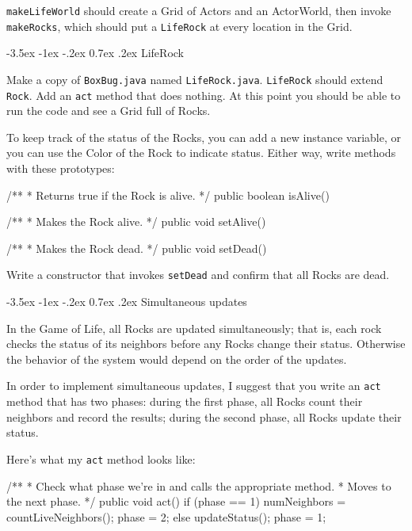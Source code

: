 \documentclass[12pt]{book}
\makeatletter
\renewcommand{\section}{\@startsection {section}{1}{\z@}%
    {-3.5ex \@plus -1ex \@minus -.2ex}%
    {0.7ex \@plus.2ex}%
    {\normalfont\Large\bfseries}}
\theoremstyle{exercise}
\newcommand{\java}[1]{\lstinline{#1}} %
\makeatother
\begin{document}
\java{makeLifeWorld} should create a Grid of Actors and an ActorWorld, then invoke \java{makeRocks}, which should put a \java{LifeRock} at every location in the Grid.


\section{LifeRock}

Make a copy of \java{BoxBug.java} named \java{LifeRock.java}.
\java{LifeRock} should extend \java{Rock}.
Add an \java{act} method that does nothing.
At this point you should be able to run the code and see a Grid full of Rocks.

To keep track of the status of the Rocks, you can add a new instance variable, or you can use the Color of the Rock to indicate status.
Either way, write methods with these prototypes:

\begin{code}
    /**
     * Returns true if the Rock is alive.
     */
    public boolean isAlive()

    /**
     * Makes the Rock alive.
     */
    public void setAlive()

    /**
     * Makes the Rock dead.
     */
    public void setDead()
\end{code}

Write a constructor that invokes \java{setDead} and confirm that all Rocks are dead.


\section{Simultaneous updates}

In the Game of Life, all Rocks are updated simultaneously; that is, each rock checks the status of its neighbors before any Rocks change their status.
Otherwise the behavior of the system would depend on the order of the updates.

In order to implement simultaneous updates, I suggest that you write an \java{act} method that has two phases: during the first phase, all Rocks count their neighbors and record the results; during the second phase, all Rocks update their status.

Here's what my \java{act} method looks like:

\begin{code}
    /**
     * Check what phase we're in and calls the appropriate method.
     * Moves to the next phase.
     */
    public void act() {
        if (phase == 1) {
            numNeighbors = countLiveNeighbors();
            phase = 2;
        } else {
            updateStatus();
            phase = 1;
        }
    }
\end{code}
\end{document}
